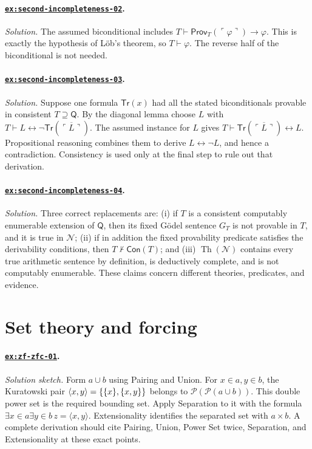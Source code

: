 \documentclass[11pt,oneside,openany]{book}
\theoremstyle{definition}
\theoremstyle{plain}
\theoremstyle{remark}
\DeclarePairedDelimiter{\set}{\lbrace}{\rbrace}
\newcommand{\Pow}{\mathcal{P}}
\newcommand{\Th}{\operatorname{Th}}
\newcommand{\derives}{\vdash}
\newcommand{\notderives}{\not\vdash}
\begin{document}
\paragraph{\hyperref[ex:second-incompleteness-02]{\texttt{ex:second-incompleteness-02}}.}\mbox{}\par
\noindent
\textit{Solution.}  The assumed biconditional includes
\(T\derives\mathsf{Prov}_T(\ulcorner\varphi\urcorner)\to\varphi\).  This is
exactly the hypothesis of L\"ob's theorem, so
\(T\derives\varphi\).  The reverse half of the biconditional is not needed.

\paragraph{\hyperref[ex:second-incompleteness-03]{\texttt{ex:second-incompleteness-03}}.}
\textit{Solution.}  Suppose one formula \(\mathsf{Tr}(x)\) had all the stated
biconditionals provable in consistent \(T\supseteq\mathsf Q\).  By the diagonal
lemma choose \(L\) with
\(T\derives L\leftrightarrow
\neg\mathsf{Tr}(\overline{\ulcorner L\urcorner})\).  The
assumed instance for \(L\) gives
\(T\derives\mathsf{Tr}(\overline{\ulcorner L\urcorner})\leftrightarrow L\).
Propositional reasoning combines them to derive \(L\leftrightarrow\neg L\),
and hence a contradiction.  Consistency is used only at the final step to rule
out that derivation.

\paragraph{\hyperref[ex:second-incompleteness-04]{\texttt{ex:second-incompleteness-04}}.}
\textit{Solution.}  Three correct replacements are: (i) if \(T\) is a
consistent computably enumerable extension of \(\mathsf Q\), then its fixed
G\"odel sentence \(G_T\) is not provable in \(T\), and it is true in
\(\mathcal N\); (ii) if in addition the fixed provability predicate satisfies
the derivability conditions, then \(T\notderives\mathsf{Con}(T)\); and
(iii) \(\Th(\mathcal N)\) contains every true arithmetic sentence by
definition, is deductively complete, and is not computably enumerable.  These
claims concern different theories, predicates, and evidence.

\section{Set theory and forcing}

\paragraph{\hyperref[ex:zf-zfc-01]{\texttt{ex:zf-zfc-01}}.}
\textit{Solution sketch.}  Form \(a\cup b\) using Pairing and Union.  For
\(x\in a,y\in b\), the Kuratowski pair
\(\langle x,y\rangle=\set{\set{x},\set{x,y}}\) belongs to
\(\Pow(\Pow(a\cup b))\).  This double power set is the required bounding set.
Apply Separation to it with the formula
\(\exists x\in a\exists y\in b\,z=\langle x,y\rangle\).  Extensionality
identifies the separated set with \(a\times b\).  A complete derivation should
cite Pairing, Union, Power Set twice, Separation, and Extensionality at these
exact points.
\end{document}
